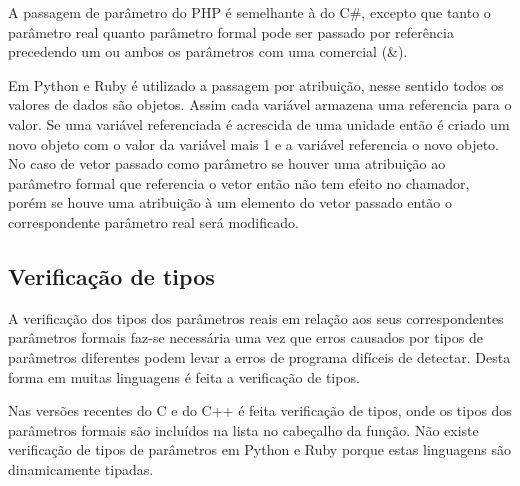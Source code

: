 A passagem de parâmetro do PHP é semelhante à do C\#, excepto que tanto o parâmetro real quanto parâmetro formal pode ser passado por referência precedendo um ou ambos os parâmetros com uma comercial (\&).

Em Python e Ruby é utilizado a passagem por atribuição, nesse sentido todos os valores de dados são objetos. Assim cada variável armazena uma referencia para o valor. Se uma variável referenciada é acrescida de uma unidade então é criado um novo objeto com o valor da variável mais 1 e a variável referencia o novo objeto. No caso de vetor passado como parâmetro se houver uma atribuição ao parâmetro formal que referencia o vetor então não tem efeito no chamador, porém se houve uma atribuição à um elemento do vetor passado então o correspondente parâmetro real será modificado.

\subsection{Verificação de tipos}
A verificação dos tipos dos parâmetros reais em relação aos seus correspondentes parâmetros formais faz-se necessária uma vez que erros causados por tipos de parâmetros diferentes podem levar a erros de programa difíceis de detectar. Desta forma em muitas linguagens é feita a verificação de tipos.

Nas versões recentes do C e do C++ é feita verificação de tipos, onde os tipos dos parâmetros formais são incluídos na lista no cabeçalho da função. Não existe verificação de tipos de parâmetros em Python e Ruby porque estas linguagens são dinamicamente tipadas.




